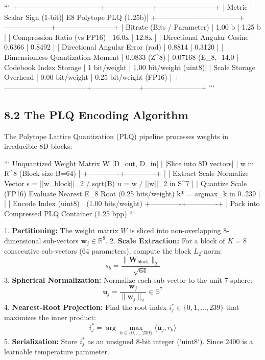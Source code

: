 \documentclass[11pt,twoside,openright]{amsbook}
\begin{document}
```
+-----------------------------------+--------------------+------------------------+
| Metric                            | Scalar Sign (1-bit)| E8 Polytope PLQ (1.25b)|
+-----------------------------------+--------------------+------------------------+
| Bitrate (Bits / Parameter)        | 1.00 b             | 1.25 b                 |
| Compression Ratio (vs FP16)       | 16.0x              | 12.8x                  |
| Directional Angular Cosine        | 0.6366             | 0.8492                 |
| Directional Angular Error (rad)   | 0.8814             | 0.3120                 |
| Dimensionless Quantization Moment | 0.0833 (Z^8)       | 0.07168 (E_8, -14.0%
| Codebook Index Storage            | 1 bit/weight       | 1.00 bit/weight (uint8)|
| Scale Storage Overhead            | 0.00 bit/weight    | 0.25 bit/weight (FP16) |
+-----------------------------------+--------------------+------------------------+
```

\subsection{8.2 The PLQ Encoding Algorithm}

The Polytope Lattice Quantization (PLQ) pipeline processes weights in irreducible 8D blocks:

```
Unquantized Weight Matrix W [D_out, D_in]
                  |
         [Slice into 8D vectors]
                  |
           w in R^8 (Block size B=64)
                  |
    +-------------+-------------+
    |                           |
Extract Scale             Normalize Vector
s = ||w_block||_2 / sqrt(B)   u = w / ||w||_2  in S^7
    |                           |
Quantize Scale (FP16)      Evaluate Nearest E_8 Root
(0.25 bits/weight)         k* = argmax_{k in 0..239} 
    |                           |
    |                      Encode Index (uint8)
    |                      (1.00 bits/weight)
    +-------------+-------------+
                  |
Pack into Compressed PLQ Container (1.25 bpp)
```

1. \textbf{Partitioning:} The weight matrix $W$ is sliced into non-overlapping 8-dimensional sub-vectors $\mathbf{w}_j \in \mathbb{R}^8$.
2. \textbf{Scale Extraction:} For a block of $K = 8$ consecutive sub-vectors (64 parameters), compute the block $L_2$-norm:
   $$s_b = \frac{\|\mathbf{W}_{\text{block}}\|_2}{\sqrt{64}}$$
3. \textbf{Spherical Normalization:} Normalize each sub-vector to the unit 7-sphere:
   $$\mathbf{u}_j = \frac{\mathbf{w}_j}{\|\mathbf{w}_j\|_2} \in \mathbb{S}^7$$
4. \textbf{Nearest-Root Projection:} Find the root index $i_j^* \in \{0, 1, \dots, 239\}$ that maximizes the inner product:
   $$i_j^* = \arg\max_{k \in \{0, \dots, 239\}} \langle \mathbf{u}_j, r_k \rangle$$
5. \textbf{Serialization:} Store $i_j^*$ as an unsigned 8-bit integer (`uint8`). Since $240  0$ is a learnable temperature parameter.
\end{document}
